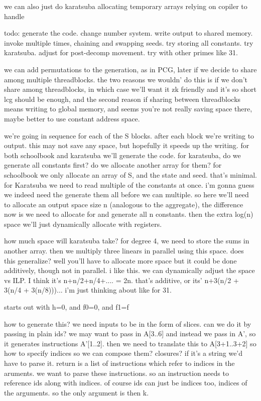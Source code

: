 we can also just do karatsuba allocating temporary arrays relying on copiler to handle

todo:
generate the code.
change number system.
write output to shared memory.
invoke multiple times, chaining and swapping seeds. 
try storing all constants.
try karatsuba. 
adjust for post-decomp movement.
try with other primes like 31. 

we can add permutations to the generation, as in PCG, later if we decide to share among multiple threadblocks. the two reasons we wouldn' do this is if we don't share among threadblocks, in which case we'll want it zk friendly and it's so short lcg should be enough, and the second reason if sharing between threadblocks means writing to global memory, and seems you're not really saving space there, maybe better to use constant address space. 

we're going in sequence for each of the S blocks. after each block we're writing to output. this may not save any space, but hopefully it speeds up the writing.
for both schoolbook and karatsuba we'll generate the code. for karatsuba, do we generate all constants first? do we allocate another array for them? 
for schoolbook we only allocate an array of S, and the state and seed. that's minimal.
for Karatsuba we need to read multiple of the constants at once. i'm gonna guess we indeed need the generate them all before we can multiple. so here we'll need to allocate an output space size n (analogous to the aggregate), the difference now is we need to allocate for and generate all n constants. then the extra log(n) space we'll just dynamically allocate with registers. 


how much space will karatsuba take?
for degree 4, we need to store the sums in another array. then we multiply three linears in parallel using this space. 
does this generalize? well you'll have to allocate more space but it could be done additively, though not in parallel. i like this. we can dynamically adjust the space vs ILP. I think it's n+n/2+n/4+.... = 2n. that's additive, or its' n+3(n/2 + 3(n/4 + 3(n/8)))... i'm just thinking about like for 31.

starts out with h=0, and f0=0, and f1=f


how to generate this?
we need inputs to be in the form of slices. 
can we do it by passing in plain ids? we may want to pass in A[3..6] and instead we pass in A', so it generates instructions A'[1..2]. then we need to translate this to A[3+1..3+2]
so how to specify indices so we can compose them? closures? if it's a string we'd have to parse it. return is a list of instructions which refer to indices in the aruments. we want to parse these instructions. so an instruction needs to reference ids along with indices. 
of course ids can just be indices too, indices of the arguments. so the only argument is then k. 

